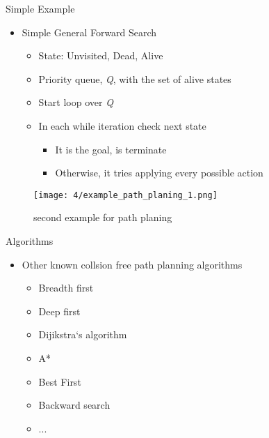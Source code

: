 \documentclass[%
  professionalfonts,%
  xcolor={%
    usenames,%
    dvipsnames,%
    svgnames,%
    table,%
    hyperref%
  }%
]{beamer}
\begin{document}
      \begin{frame}{Simple Example}
        \begin{itemize}
          \item Simple General Forward Search
          \begin{itemize}
            \item State: Unvisited, Dead, Alive
            \item Priority queue, \emph{Q}, with the set of alive states
            \item Start loop over \emph{Q}
            \item In each while iteration check next state
            \begin{itemize}
              \item It is the goal, is terminate
              \item Otherwise, it tries applying every possible action
             \end{itemize} 
          \end{itemize}
        \end{itemize}
        \begin{figure}[h]
          \texttt{[image: 4/example\_path\_planing\_1.png]}
          \caption{second example for path planing}
          \label{fig:example path planing 1}
        \end{figure}
      \end{frame}
      
      \begin{frame}{Algorithms}
        \begin{itemize}
          \item Other known collsion free path planning algorithms
          \begin{itemize}
            \item Breadth first
            \item Deep first
            \item Dijikstra‘s algorithm
            \item A*
            \item Best First
            \item Backward search
            \item ...
          \end{itemize}
        \end{itemize}
      \end{frame}
\end{document}
